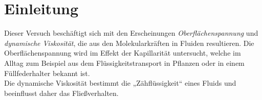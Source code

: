 \section{Einleitung}
Dieser Versuch beschäftigt sich mit den Erscheinungen \textit{Oberflächenspannung} und \textit{dynamische Viskosität}, die aus den Molekularkräften in Fluiden resultieren. Die Oberflächenspannung wird im Effekt der Kapillarität untersucht, welche im Alltag zum Beispiel aus dem Flüssigkeitstransport in Pflanzen oder in einem Füllfederhalter bekannt ist.\\
Die dynamische Viskosität bestimmt die „Zähflüssigkeit“ eines Fluids und beeinflusst daher das Fließverhalten.